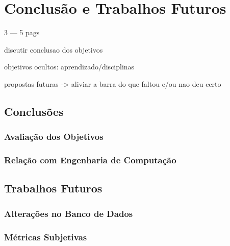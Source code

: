 
\chapter{Conclusão e Trabalhos Futuros}
3 --- 5 pags

discutir conclusao dos objetivos

objetivos ocultos: aprendizado/disciplinas

propostas futuras -> aliviar a barra do que faltou e/ou nao deu certo

\section{Conclusões}
\subsection{Avaliação dos Objetivos}
\subsection{Relação com Engenharia de Computação}

\section{Trabalhos Futuros}
\subsection{Alterações no Banco de Dados}
\subsection{Métricas Subjetivas}

